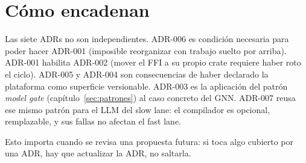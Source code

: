\section{Cómo encadenan}

Las siete ADRs no son independientes. ADR-006 es condición
necesaria para poder hacer ADR-001 (imposible reorganizar con
trabajo suelto por arriba). ADR-001 habilita ADR-002 (mover el FFI
a su propio crate requiere haber roto el ciclo). ADR-005 y ADR-004
son consecuencias de haber declarado la plataforma como superficie
versionable. ADR-003 es la aplicación del patrón \emph{model gate}
(capítulo~\ref{sec:patrones}) al caso concreto del GNN. ADR-007
reusa ese mismo patrón para el LLM del slow lane: el compilador es
opcional, remplazable, y sus fallas no afectan el fast lane.

Esto importa cuando se revisa una propuesta futura: si toca algo
cubierto por una ADR, hay que actualizar la ADR, no saltarla.
